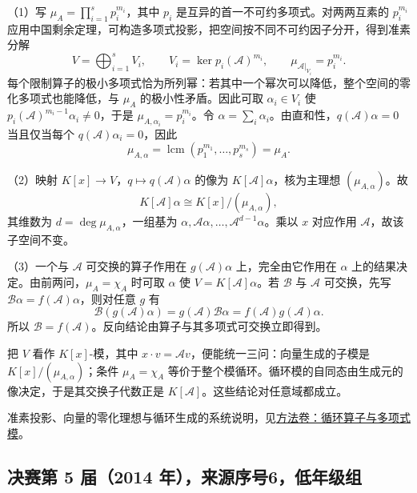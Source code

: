 \documentclass[12pt,fontset=fandol]{ctexart}
\begin{document}
\begin{solve}

（1）写 $\mu_A=\prod_{i=1}^s p_i^{m_i}$，其中 $p_i$ 是互异的首一不可约多项式。对两两互素的 $p_i^{m_i}$ 应用中国剩余定理，可构造多项式投影，把空间按不同不可约因子分开，得到准素分解
\[
V=\bigoplus_{i=1}^s V_i,\qquad
V_i=\ker p_i(\mathcal A)^{m_i},\qquad
\mu_{\mathcal A|_{V_i}}=p_i^{m_i}.
\]
每个限制算子的极小多项式恰为所列幂：若其中一个幂次可以降低，整个空间的零化多项式也能降低，与 $\mu_A$ 的极小性矛盾。因此可取 $\alpha_i\in V_i$ 使 $p_i(\mathcal A)^{m_i-1}\alpha_i\neq0$，于是 $\mu_{A,\alpha_i}=p_i^{m_i}$。令 $\alpha=\sum_i\alpha_i$。由直和性，$q(\mathcal A)\alpha=0$ 当且仅当每个 $q(\mathcal A)\alpha_i=0$，因此
\[
\mu_{A,\alpha}=\operatorname{lcm}(p_1^{m_1},\ldots,p_s^{m_s})=\mu_A.
\]

（2）映射 $K[x]\to V$，$q\mapsto q(\mathcal A)\alpha$ 的像为 $K[\mathcal A]\alpha$，核为主理想 $(\mu_{A,\alpha})$。故
\[
K[\mathcal A]\alpha\cong K[x]/(\mu_{A,\alpha}),
\]
其维数为 $d=\deg\mu_{A,\alpha}$，一组基为 $\alpha,\mathcal A\alpha,\ldots,\mathcal A^{d-1}\alpha$。乘以 $x$ 对应作用 $\mathcal A$，故该子空间不变。

（3）一个与 $\mathcal A$ 可交换的算子作用在 $g(\mathcal A)\alpha$ 上，完全由它作用在 $\alpha$ 上的结果决定。由前两问，$\mu_A=\chi_A$ 时可取 $\alpha$ 使 $V=K[\mathcal A]\alpha$。若 $\mathcal B$ 与 $\mathcal A$ 可交换，先写 $\mathcal B\alpha=f(\mathcal A)\alpha$，则对任意 $g$ 有
\[
\mathcal B(g(\mathcal A)\alpha)
=g(\mathcal A)\mathcal B\alpha
=f(\mathcal A)g(\mathcal A)\alpha.
\]
所以 $\mathcal B=f(\mathcal A)$。反向结论由算子与其多项式可交换立即得到。

\end{solve}

\begin{remark}[方法与条件]

把 $V$ 看作 $K[x]$-模，其中 $x\cdot v=\mathcal Av$，便能统一三问：向量生成的子模是 $K[x]/(\mu_{A,\alpha})$；条件 $\mu_A=\chi_A$ 等价于整个模循环。循环模的自同态由生成元的像决定，于是其交换子代数正是 $K[\mathcal A]$。这些结论对任意域都成立。

准素投影、向量的零化理想与循环生成的系统说明，见\hyperref[app:linear-cyclic]{方法卷：循环算子与多项式模}。

\end{remark}

\subsection{决赛第 5 届（2014 年），来源序号6，低年级组}\label{ans:fin05-lo:3}\label{pr:fin05-lo:3}
\end{document}

